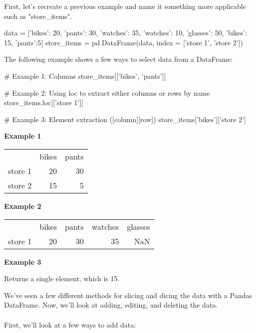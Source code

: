 \documentclass{article}
\begin{document}
First, let's recreate a previous example and name it something more applicable such as "store\_items".

\begin{python}
	data = [{'bikes': 20, 'pants': 30, 'watches': 35},
	{'watches': 10, 'glasses': 50, 'bikes': 15, 'pants':5}]
	store_items = pd.DataFrame(data, index = ['store 1', 'store 2'])
\end{python}

The following example shows a few ways to select data from a DataFrame:

\begin{python}
	# Example 1: Columns
	store_items[['bikes', 'pants']]
	
	# Example 2: Using loc to extract either columns or rows by name
	store_items.loc[['store 1']]
	
	# Example 3: Element extraction ([column][row])
	store_items['bikes']['store 2']
\end{python}

\textbf{Example 1}
\begin{center}
	\begin{tabular}{lrr}
		{} &  bikes &  pants \\
		store 1 &     20 &     30 \\
		store 2 &     15 &      5 \\
	\end{tabular}
\end{center}

\textbf{Example 2}
\begin{center}
	\begin{tabular}{lrrrr}
		{} &  bikes &  pants &  watches &  glasses \\
		store 1 &     20 &     30 &       35 &      NaN \\
	\end{tabular}
\end{center}

\textbf{Example 3}
\begin{center}
Returns a single element, which is 15.
\end{center}

We've seen a few different methods for slicing and dicing the data with a Pandas DataFrame. Now, we'll look at adding, editing, and deleting the data.
\\\\

First, we'll look at a few ways to add data:
\end{document}
